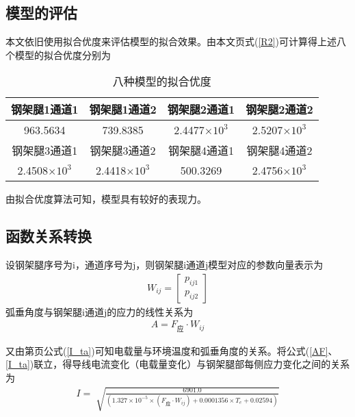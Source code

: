 \documentclass[withoutpreface,bwprint]{cumcmthesis}  %
\begin{document}
	\subsection{模型的评估}
        本文依旧使用拟合优度来评估模型的拟合效果。由本文\pageref{R2}页式(\ref{R2})可计算得上述八个模型的拟合优度分别为
        \vspace{16pt}
        \begin{table}[h] 
            \centering
            \caption{八种模型的拟合优度} 
            \begin{tabular}{cccc}  
                \toprule  
                    钢架腿1通道1 & 钢架腿1通道2 & 钢架腿2通道1 & 钢架腿2通道2\\  
                \midrule  
                    963.5634 & 739.8385 & 2.4477$\times10^{3}$ & 2.5207$\times10^{3}$\\
                \midrule
                    钢架腿3通道1& 钢架腿3通道2& 钢架腿4通道1& 钢架腿4通道2\\
                \midrule
                	2.4508$\times10^{3}$&2.4418$\times10^{3}$ &500.3269&2.4756$\times10^{3}$\\
                \bottomrule
            \end{tabular}  
            \label{tab:p3_R2}
        \end{table}

        由拟合优度算法可知，模型具有较好的表现力。

        \subsection{函数关系转换}
        设钢架腿序号为i，通道序号为j，则钢架腿i通道j模型对应的参数向量表示为
        \begin{align}
            W_{ij}=\begin{bmatrix}p_{ij1}\\p_{ij2}\end{bmatrix}
        \end{align}
        弧垂角度与钢架腿i通道j的应力的线性关系为
        \begin{align}
            A=F_{\text{应}}\cdot W_{ij}
            \label{AF}
        \end{align}

        又由第\pageref{I_ta}页公式(\ref{I_ta})可知电载量与环境温度和弧垂角度的关系。将公式(\ref{AF}、\ref{I_ta})联立，得导线电流变化（电载量变化）与钢架腿部每侧应力变化之间的关系为
        \begin{align}
            I=\sqrt[]{ \frac{6901.0}{(1.327\times 10^{-5}\times (F_{\text{应}}\cdot W_{ij}) + 0.0001356\times T_{e} + 0.02594)} }
            \label{IF}
        \end{align}
\end{document}
